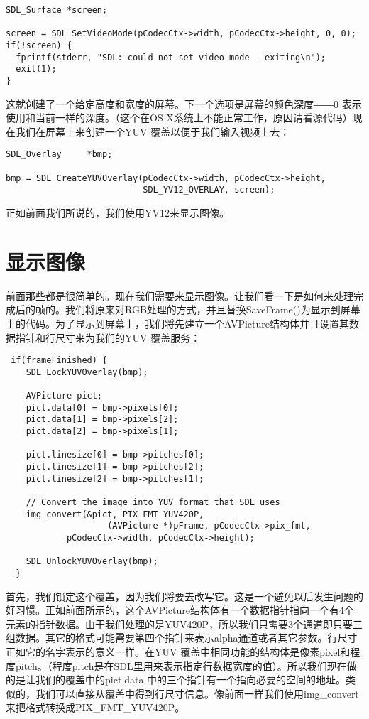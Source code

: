 \begin{lstlisting}
SDL_Surface *screen;

screen = SDL_SetVideoMode(pCodecCtx->width, pCodecCtx->height, 0, 0);
if(!screen) {
  fprintf(stderr, "SDL: could not set video mode - exiting\n");
  exit(1);
}
\end{lstlisting}

这就创建了一个给定高度和宽度的屏幕。下一个选项是屏幕的颜色深度――0 表示使用和当前一样的深度。（这个在OS X系统上不能正常工作，原因请看源代码）现在我们在屏幕上来创建一个YUV 覆盖以便于我们输入视频上去：

\begin{lstlisting}
SDL_Overlay     *bmp;

bmp = SDL_CreateYUVOverlay(pCodecCtx->width, pCodecCtx->height,
                           SDL_YV12_OVERLAY, screen);
\end{lstlisting}

正如前面我们所说的，我们使用YV12来显示图像。

\section{显示图像}

前面那些都是很简单的。现在我们需要来显示图像。让我们看一下是如何来处理完成后的帧的。我们将原来对RGB处理的方式，并且替换SaveFrame()为显示到屏幕上的代码。为了显示到屏幕上，我们将先建立一个AVPicture结构体并且设置其数据指针和行尺寸来为我们的YUV 覆盖服务：

\begin{lstlisting}
 if(frameFinished) {
    SDL_LockYUVOverlay(bmp);

    AVPicture pict;
    pict.data[0] = bmp->pixels[0];
    pict.data[1] = bmp->pixels[2];
    pict.data[2] = bmp->pixels[1];

    pict.linesize[0] = bmp->pitches[0];
    pict.linesize[1] = bmp->pitches[2];
    pict.linesize[2] = bmp->pitches[1];

    // Convert the image into YUV format that SDL uses
    img_convert(&pict, PIX_FMT_YUV420P,
                    (AVPicture *)pFrame, pCodecCtx->pix_fmt,
            pCodecCtx->width, pCodecCtx->height);

    SDL_UnlockYUVOverlay(bmp);
  }
\end{lstlisting}

首先，我们锁定这个覆盖，因为我们将要去改写它。这是一个避免以后发生问题的好习惯。正如前面所示的，这个AVPicture结构体有一个数据指针指向一个有4个元素的指针数据。由于我们处理的是YUV420P，所以我们只需要3个通道即只要三组数据。其它的格式可能需要第四个指针来表示alpha通道或者其它参数。行尺寸正如它的名字表示的意义一样。在YUV 覆盖中相同功能的结构体是像素pixel和程度pitch。（程度pitch是在SDL里用来表示指定行数据宽度的值）。所以我们现在做的是让我们的覆盖中的pict.data 中的三个指针有一个指向必要的空间的地址。类似的，我们可以直接从覆盖中得到行尺寸信息。像前面一样我们使用img_convert来把格式转换成PIX_FMT_YUV420P。

